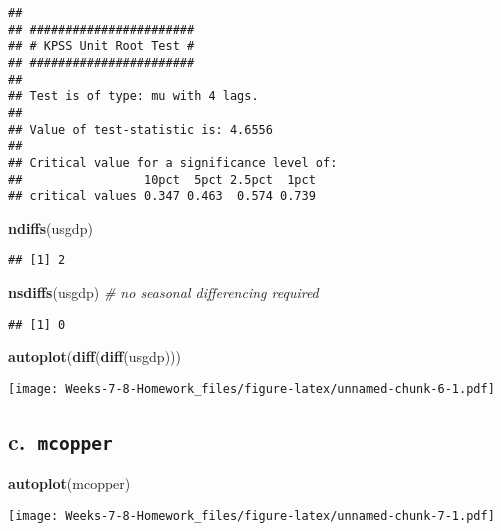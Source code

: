 \documentclass[]{article}
\newenvironment{Shaded}{\begin{snugshade}}{\end{snugshade}}
\newcommand{\CommentTok}[1]{\textcolor[rgb]{0.56,0.35,0.01}{\textit{#1}}}
\newcommand{\KeywordTok}[1]{\textcolor[rgb]{0.13,0.29,0.53}{\textbf{#1}}}
\newcommand{\NormalTok}[1]{#1}
\begin{document}
\begin{verbatim}
## 
## ####################### 
## # KPSS Unit Root Test # 
## ####################### 
## 
## Test is of type: mu with 4 lags. 
## 
## Value of test-statistic is: 4.6556 
## 
## Critical value for a significance level of: 
##                 10pct  5pct 2.5pct  1pct
## critical values 0.347 0.463  0.574 0.739
\end{verbatim}

\begin{Shaded}
\begin{Highlighting}[]
\KeywordTok{ndiffs}\NormalTok{(usgdp)}
\end{Highlighting}
\end{Shaded}

\begin{verbatim}
## [1] 2
\end{verbatim}

\begin{Shaded}
\begin{Highlighting}[]
\KeywordTok{nsdiffs}\NormalTok{(usgdp) }\CommentTok{# no seasonal differencing required}
\end{Highlighting}
\end{Shaded}

\begin{verbatim}
## [1] 0
\end{verbatim}

\begin{Shaded}
\begin{Highlighting}[]
\KeywordTok{autoplot}\NormalTok{(}\KeywordTok{diff}\NormalTok{(}\KeywordTok{diff}\NormalTok{(usgdp)))}
\end{Highlighting}
\end{Shaded}

\texttt{[image: Weeks-7-8-Homework\_files/figure-latex/unnamed-chunk-6-1.pdf]}

\hypertarget{c.-mcopper}{%
\subsection{\texorpdfstring{c.~\texttt{mcopper}}{c.~mcopper}}\label{c.-mcopper}}

\begin{Shaded}
\begin{Highlighting}[]
\KeywordTok{autoplot}\NormalTok{(mcopper)}
\end{Highlighting}
\end{Shaded}

\texttt{[image: Weeks-7-8-Homework\_files/figure-latex/unnamed-chunk-7-1.pdf]}
\end{document}
